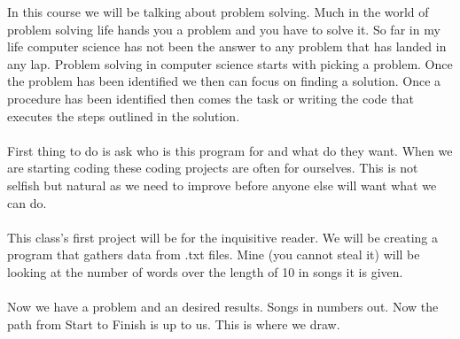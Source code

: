 \documentclass[..main.tex]{subfiles}
\begin{document}
In this course we will be talking about problem solving. Much in the world of problem solving life hands you a problem and you have to solve it. So far in my life computer science has not been the answer to any problem that has landed in any lap. Problem solving in computer science starts with picking a problem. Once the problem has been identified we then can focus on finding a solution. Once a procedure has been identified then comes the task or writing the code that executes the steps outlined in the solution. \\
\\
First thing to do is ask who is this program for and what do they want. When we are starting coding these coding projects are often for ourselves. This is not selfish but natural as we need to improve before anyone else will want what we can do. \\
\\
This class's first project will be for the inquisitive reader. We will be creating a program that gathers data from .txt files. Mine (you cannot steal it) will be looking at the number of words over the length of 10 in songs it is given. \\
\\
Now we have a problem and an desired results. Songs in numbers out. Now the path from Start to Finish is up to us. This is where we draw. \\
\\
\begin{center}
\end{center}
\end{document}
